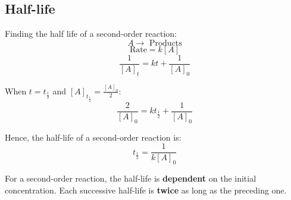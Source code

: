 \documentclass[11pt]{article}
\begin{document}
\subsection{Half-life}
\label{sec:org5b60bbe}

Finding the half life of a second-order reaction:
\[A \rightarrow \text{ Products}\]
\[\text{Rate} = k[A]\]
\[\frac{1}{[A]_t} = kt + \frac{1}{[A]_0}\]

When \(t = t_{\frac{1}{2}}\) and \([A]_{t_{\frac{1}{2}}} = \frac{[A]_0}{2}\):
\[\frac{2}{[A]_0} = kt_{\frac{1}{2}} + \frac{1}{[A]_0}\]

Hence, the half-life of a second-order reaction is:
\[t_{\frac{1}{2}} = \frac{1}{k[A]_0}\]

For a second-order reaction, the half-life is \textbf{dependent} on the initial concentration. Each successive half-life is \textbf{twice} as long as the preceding one.
\end{document}

